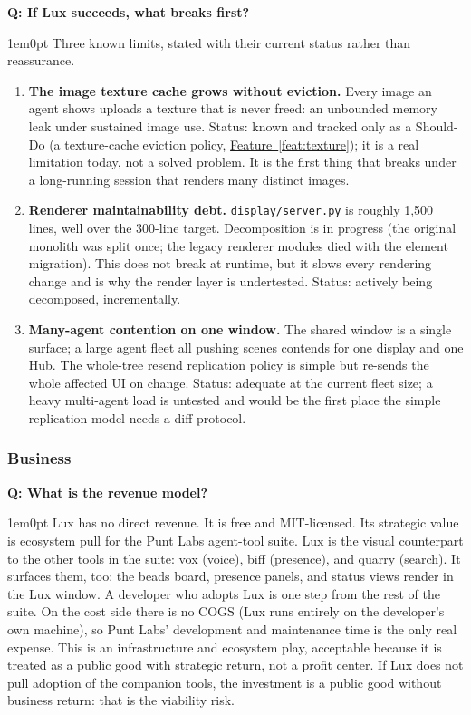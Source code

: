 \documentclass[11pt,letterpaper]{article}
\newcounter{faqnum}
\newenvironment{faqpair}[1]{%
  \needspace{4\baselineskip}%
  \vspace{0.5em}%
  \refstepcounter{faqnum}%
  \noindent\textbf{\color{SectionBlue}Q\thefaqnum: #1}\par\nopagebreak[4]%
  \vspace{0.2em}%
  \begin{adjustwidth}{1em}{0pt}%
  \setlength{\parindent}{0pt}%
}{%
  \end{adjustwidth}%
  \vspace{0.5em}%
}
\newcommand{\featureref}[1]{\hyperref[#1]{Feature~\ref*{#1}}}
\begin{document}
\begin{faqpair}{If Lux succeeds, what breaks first?}\label{faq:scaling}
  Three known limits, stated with their current status rather than reassurance.

  \begin{enumerate}[nosep]
    \item \textbf{The image texture cache grows without eviction.} Every image
      an agent shows uploads a texture that is never freed: an unbounded
      memory leak under sustained image use. Status: known and tracked only as a
      Should-Do (a texture-cache eviction policy, \featureref{feat:texture}); it
      is a real limitation today, not a solved problem. It is the first thing
      that breaks under a long-running session that renders many distinct images.
    \item \textbf{Renderer maintainability debt.} \texttt{display/server.py} is
      roughly 1,500 lines, well over the 300-line target. Decomposition is in
      progress (the original monolith was split once; the legacy renderer
      modules died with the element migration). This does not break at
      runtime, but it slows every rendering change and is why the render layer is
      undertested. Status: actively being decomposed, incrementally.
    \item \textbf{Many-agent contention on one window.} The shared window is a
      single surface; a large agent fleet all pushing scenes contends for one
      display and one Hub. The whole-tree resend replication policy is simple but
      re-sends the whole affected UI on change. Status: adequate at the current
      fleet size; a heavy multi-agent load is untested and would be the first
      place the simple replication model needs a diff protocol.
  \end{enumerate}
\end{faqpair}

\subsubsection*{Business}

\begin{faqpair}{What is the revenue model?}\label{faq:revenue}
  Lux has no direct revenue. It is free and MIT-licensed. Its strategic value is
  ecosystem pull for the Punt Labs agent-tool suite. Lux is the visual
  counterpart to the other tools in the suite: vox (voice), biff (presence), and
  quarry (search). It surfaces them, too: the beads board, presence panels, and
  status views render in the Lux window. A developer who adopts Lux is one step
  from the rest of the suite. On the cost side there is no COGS (Lux runs
  entirely on the developer's own machine), so Punt Labs' development and
  maintenance time is the only real expense. This is an infrastructure and
  ecosystem play, acceptable because it is treated as a public good with
  strategic return, not a profit center. If Lux does not pull adoption of the companion
  tools, the investment is a public good without business return: that is
  the viability risk.
\end{faqpair}
\end{document}
